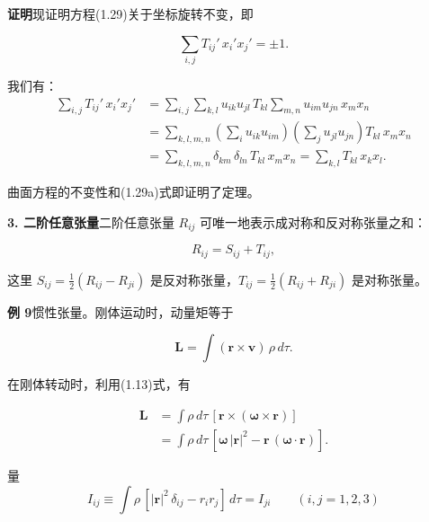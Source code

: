 \documentclass[11pt,a4paper,oneside]{ctexbook}
\newcommand{\ve}[1]{\bm{#1}}
\begin{document}
\textbf{证明}\quad 现证明方程(1.29)关于坐标旋转不变，即

\begin{equation*}
\sum_{i,j} T_{ij}'\, x_i' x_j' = \pm 1.
\end{equation*}

我们有：
\begin{equation*}
\begin{aligned}
\sum_{i,j} T_{ij}'\, x_i' x_j'
&= \sum_{i,j} \sum_{k,l} u_{ik} u_{jl}\, T_{kl} \sum_{m,n} u_{im} u_{jn}\, x_m x_n\\
&= \sum_{k,l,m,n} \left(\sum_{i} u_{ik} u_{im}\right) \left(\sum_{j} u_{jl} u_{jn}\right) T_{kl}\, x_m x_n\\
&= \sum_{k,l,m,n} \delta_{km}\, \delta_{ln}\, T_{kl}\, x_m x_n = \sum_{k,l} T_{kl}\, x_k x_l.
\end{aligned}
\end{equation*}

曲面方程的不变性和(1.29a)式即证明了定理。

\textbf{3. 二阶任意张量}\quad 二阶任意张量 $R_{ij}$ 可唯一地表示成对称和反对称张量之和：

\begin{equation*}
R_{ij} = S_{ij} + T_{ij},
\end{equation*}

这里 $S_{ij} = \frac{1}{2}(R_{ij} - R_{ji})$ 是反对称张量，$T_{ij} = \frac{1}{2}(R_{ij} + R_{ji})$ 是对称张量。

\textbf{例 9}\quad 惯性张量。刚体运动时，动量矩等于

\begin{equation*}
\ve{L} = \int (\ve{r} \times \ve{v})\, \rho\, d\tau.
\end{equation*}

在刚体转动时，利用(1.13)式，有

\begin{equation*}
\begin{aligned}
\ve{L} &= \int \rho\, d\tau\, [\ve{r} \times (\ve{\omega} \times \ve{r})]\\
&= \int \rho\, d\tau\, [\ve{\omega}\,|\ve{r}|^{2} - \ve{r}\,(\ve{\omega} \cdot \ve{r})].
\end{aligned}
\end{equation*}

量
\begin{equation*}
I_{ij} \equiv \int \rho\, [|\ve{r}|^{2}\, \delta_{ij} - r_i r_j]\, d\tau = I_{ji} \qquad (i, j = 1, 2, 3)
\end{equation*}
\end{document}
